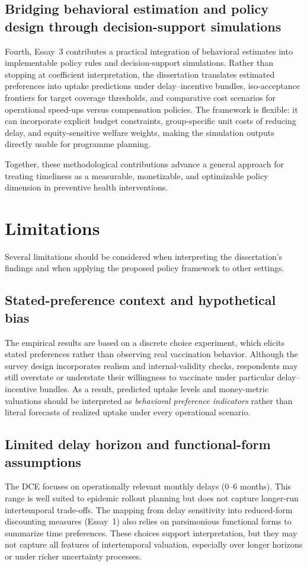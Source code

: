 \documentclass[doublespacing]{utdthesis}
\begin{document}
\subsection{Bridging behavioral estimation and policy design through decision-support simulations}
Fourth, Essay~3 contributes a practical integration of behavioral estimates into implementable policy rules and decision-support simulations. Rather than stopping at coefficient interpretation, the dissertation translates estimated preferences into uptake predictions under delay--incentive bundles, iso-acceptance frontiers for target coverage thresholds, and comparative cost scenarios for operational speed-ups versus compensation policies. The framework is flexible: it can incorporate explicit budget constraints, group-specific unit costs of reducing delay, and equity-sensitive welfare weights, making the simulation outputs directly usable for programme planning.

Together, these methodological contributions advance a general approach for treating timeliness as a measurable, monetizable, and optimizable policy dimension in preventive health interventions.


\section{Limitations}
\label{sec:dissertation_limitations}

Several limitations should be considered when interpreting the dissertation’s findings and when applying the proposed policy framework to other settings.

\subsection{Stated-preference context and hypothetical bias}
The empirical results are based on a discrete choice experiment, which elicits stated preferences rather than observing real vaccination behavior. Although the survey design incorporates realism and internal-validity checks, respondents may still overstate or understate their willingness to vaccinate under particular delay--incentive bundles. As a result, predicted uptake levels and money-metric valuations should be interpreted as \emph{behavioral preference indicators} rather than literal forecasts of realized uptake under every operational scenario.

\subsection{Limited delay horizon and functional-form assumptions}
The DCE focuses on operationally relevant monthly delays (0--6 months). This range is well suited to epidemic rollout planning but does not capture longer-run intertemporal trade-offs. The mapping from delay sensitivity into reduced-form discounting measures (Essay~1) also relies on parsimonious functional forms to summarize time preferences. These choices support interpretation, but they may not capture all features of intertemporal valuation, especially over longer horizons or under richer uncertainty processes.
\end{document}

